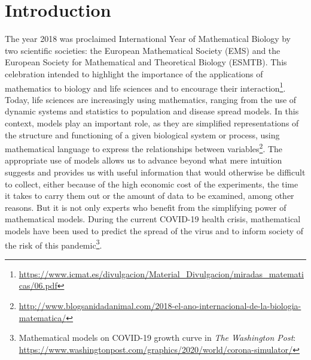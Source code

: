 \chapter{Introduction}
\label{cap:introduction}



The year 2018 was proclaimed International Year of Mathematical Biology by two scientific societies: the European Mathematical Society (EMS) and the European Society for Mathematical and Theoretical Biology (ESMTB). This celebration intended to highlight the importance of the applications of mathematics to biology and life sciences and to encourage their interaction\footnote{\url{https://www.icmat.es/divulgacion/Material_Divulgacion/miradas_matematicas/06.pdf}}. Today, life sciences are increasingly using mathematics, ranging from the use of dynamic systems and statistics to population and disease spread models. In this context, models play an important role, as they are simplified representations of the structure and functioning of a given biological system or process, using mathematical language to express the relationships between variables\footnote{\url{http://www.blogsanidadanimal.com/2018-el-ano-internacional-de-la-biologia-matematica/}}. The appropriate use of models allows us to advance beyond what mere intuition suggests and provides us with useful information that would otherwise be difficult to collect, either because of the high economic cost of the experiments, the time it takes to carry them out or the amount of data to be examined, among other reasons. But it is not only experts who benefit from the simplifying power of mathematical models. During the current COVID-19 health crisis, mathematical models have been used to predict the spread of the virus and to inform society of the risk of this pandemic\footnote{Mathematical models on COVID-19 growth curve in \textit{The Washington Post}: \url{https://www.washingtonpost.com/graphics/2020/world/corona-simulator/}}. 




